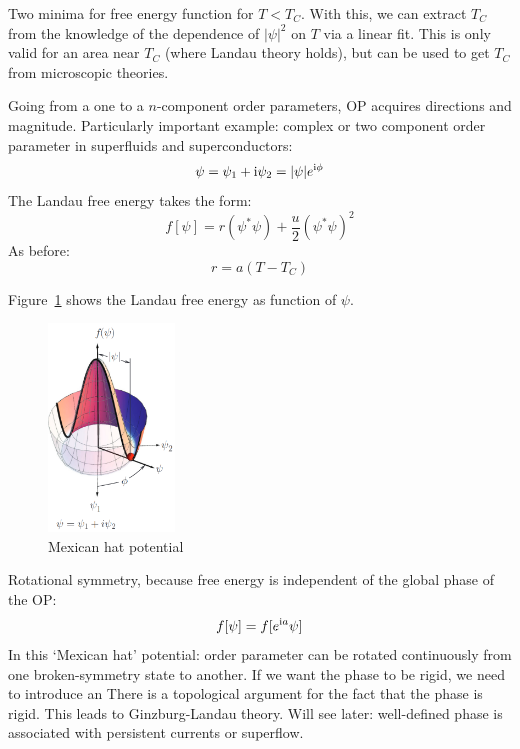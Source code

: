 \documentclass[../notes.tex]{subfiles}
\begin{document}
Two minima for free energy function for \(T < T_C\).
With this, we can extract \(T_C\) from the knowledge of the dependence of \(\vert \psi \vert^2\) on \(T\) via a linear fit.
This is only valid for an area near \(T_C\) (where Landau theory holds), but can be used to get \(T_C\) from microscopic theories.

Going from a one to a \(n\)-component order parameters, OP acquires directions and magnitude.
Particularly important example: complex or two component order parameter in superfluids and superconductors:
\begin{equation}
	\psi = \psi_1 + \mathrm{i} \psi_2 = \vert \psi \vert e^{\mathrm{i} \phi}
\end{equation}
The Landau free energy takes the form:
\begin{equation}
	f[\psi] = r(\psi^* \psi) + \frac{u}{2} (\psi^* \psi)^2
\end{equation}
As before:
\begin{equation}
	r = a(T - T_C)
\end{equation}

Figure~\ref{fig:Landau free energy mexican hat potential} shows the Landau free energy as function of \(\psi\).

\begin{figure}[t]
	\centering
	\includegraphics[width=0.3\textwidth]{images/landau free energy mexican hat}
	\caption{Mexican hat potential}
	\label{fig:Landau free energy mexican hat potential}
\end{figure}

Rotational symmetry, because free energy is independent of the global phase of the OP:
\begin{equation}
	f [\psi] = f [e^{\mathrm{i} a } \psi]
\end{equation}
In this `Mexican hat' potential: order parameter can be rotated continuously from one broken-symmetry state to another.
If we want the phase to be rigid, we need to introduce an
There is a topological argument for the fact that the phase is rigid.
This leads to Ginzburg-Landau theory.
Will see later: well-defined phase is associated with persistent currents or superflow.
\end{document}
